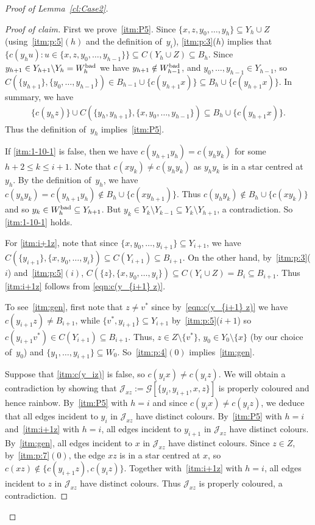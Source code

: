 \documentclass[a4paper, 12pt]{article}
\numberwithin{equation}{section}
\newenvironment{proofclaim}[1][Proof of claim]{\begin{proof}[#1]\renewcommand*{\qedsymbol}{\(\blacksquare\)}}{\end{proof}}
\def\sm{{\setminus}}
\newcommand{\ms}[1]{\mathscr{#1}}
\begin{document}
\begin{proof}[Proof of Lemma~\ref{cl:Case2}]
\begin{proofclaim}
First we prove~\ref{itm:P5}.
Since $\{ x,z,y_0, \dots, y_h \} \subseteq Y_h \cup Z$ (using~\ref{itm:p:5}$(h)$ and the definition of~$y_i$), \ref{itm:p:3}($h$) implies that $\{c(y_h u) : u \in \{ x,z,y_0, \dots, y_{h-1} \}\} \subseteq C(Y_h \cup Z) \subseteq B_{h}$.
Since $y_{h+1} \in Y_{h+1} \sm Y_{h} = W^{\rm bad}_{h}$
we have $y_{h+1} \notin W^{\rm bad}_{h-1}$, and $y_0, \dots, y_{h-1} \in Y_{h-1}$, so $C(\{y_{h+1}\}, \{ y_0, \dots, y_{h-1} \}) \in B_{h-1} \cup \{c(y_{h+1}x)\} \subseteq B_{h} \cup \{c(y_{h+1}x)\}$.
In summary, we have 
\begin{align*}
\{c(y_h z)\} \cup C(\{y_h,y_{h+1}\}, \{ x,y_0, \dots, y_{h-1} \}) \subseteq B_{{h}} \cup \{c(y_{h+1}x)\}.
\end{align*}
Thus the definition of~$y_h$ implies~\ref{itm:P5}. 

If \ref{itm:1-10-1} is false, then we have $c(y_{h+1}y_{h}) = c(y_{h}y_{k}) $ for some $h+2 \le k \le i+1$.
Note that $c(x y_k) \ne c(y_{h}y_{k})$ as $y_{h}y_{k}$ is in a star centred at $y_{h}$.
By the definition of~$y_{h}$, we have $c(y_{h}y_{k}) = c(y_{h+1}y_{h}) \notin B_{h} \cup \{c(xy_{h+1})\}$.
Thus $c(y_{h}y_{k}) \notin B_{h} \cup \{c(xy_k)\}$ and so $y_k \in W^{\rm bad}_h \subseteq Y_{h+1}$.
But $y_k \in Y_k \sm Y_{k-1} \subseteq Y_k \sm Y_{h+1}$,
 a contradiction. 
 So \ref{itm:1-10-1} holds.

For \ref{itm:i+1z}, note that since $\{ x,y_0, \dots, y_{i+1} \} \subseteq Y_{i+1}$, we have $C(\{y_{i+1}\}, \{x, y_0, \dots, y_{i} \}) \subseteq C(Y_{i+1}) \subseteq B_{{i+1}}$.
On the other hand, by~\ref{itm:p:3}($i$) and~\ref{itm:p:5}$(i)$, $C(\{z\}, \{x, y_0, \dots, y_{i} \}) \subseteq C(Y_i \cup Z) = B_{i} \subseteq B_{{i+1}}$. 
Thus \ref{itm:i+1z} follows from \eqref{eqn:c(y_{i+1} z)}.

To see~\ref{itm:gen}, first note that $z \neq v^*$ since by~\eqref{eqn:c(y_{i+1} z)} we have $c(y_{i+1}z) \neq B_{i+1}$, while $\{v^*,y_{i+1}\} \subseteq Y_{i+1}$ by~\ref{itm:p:5}($i+1$) so $c(y_{i+1}v^*) \in C(Y_{i+1}) \subseteq B_{i+1}$.
Thus, $z \in Z \sm \{v^*\}$, $y_0 \in Y_0 \sm \{x\}$ (by our choice of~$y_0$) and $\{y_1,\ldots,y_{i+1}\} \subseteq W_0$.
So~\ref{itm:p:4}$(0)$ implies~\ref{itm:gen}.


Suppose that \ref{itm:c(y_iz)} is false, so $c(y_ix) \neq c(y_iz)$. 
We will obtain a contradiction by showing that $\ms{J}_{xz} := \ms{G}[\{y_i,y_{i+1},x,z\}]$ is properly coloured and hence rainbow.
By~\ref{itm:P5} with $h=i$ and since $c(y_ix) \neq c(y_iz)$, we deduce that all edges incident to $y_i$ in $\ms{J}_{xz}$ have distinct colours.
By~\ref{itm:P5} with $h=i$ and~\ref{itm:i+1z} with $h=i$, all edges incident to $y_{i+1}$ in $\ms{J}_{xz}$ have distinct colours.
By~\ref{itm:gen}, all edges incident to $x$ in $\ms{J}_{xz}$ have distinct colours.
Since $z \in Z$, by~\ref{itm:p:7}$(0)$, the edge $xz$ is in a star centred at $x$, so $c(xz) \notin \{c(y_{i+1}z),c(y_iz)\}$.
Together with~\ref{itm:i+1z} with $h=i$, all edges incident to $z$ in $\ms{J}_{xz}$ have distinct colours.
Thus $\ms{J}_{xz}$ is properly coloured, a contradiction.
\end{proofclaim}




\end{proof}
\end{document}
